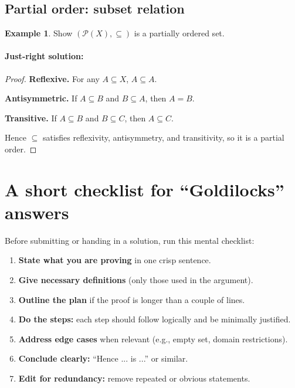 \documentclass[10pt]{article}
\theoremstyle{definition}
\newtheorem{example}{Example}[section]
\theoremstyle{plain}
\numberwithin{equation}{section}
\begin{document}
\subsection{Partial order: subset relation}
\begin{example}
Show \((\mathcal{P}(X),\subseteq)\) is a partially ordered set.
\end{example}

\paragraph{Just-right solution:}
\begin{proof}
\textbf{Reflexive.} For any \(A\subseteq X\), \(A\subseteq A\).

\textbf{Antisymmetric.} If \(A\subseteq B\) and \(B\subseteq A\), then \(A=B\).

\textbf{Transitive.} If \(A\subseteq B\) and \(B\subseteq C\), then \(A\subseteq C\).

Hence \(\subseteq\) satisfies reflexivity, antisymmetry, and transitivity, so it is a partial order.
\end{proof}

\section{A short checklist for ``Goldilocks'' answers}
Before submitting or handing in a solution, run this mental checklist:
\begin{enumerate}[label=\arabic*.]
  \item \textbf{State what you are proving} in one crisp sentence.
  \item \textbf{Give necessary definitions} (only those used in the argument).
  \item \textbf{Outline the plan} if the proof is longer than a couple of lines.
  \item \textbf{Do the steps:} each step should follow logically and be minimally justified.
  \item \textbf{Address edge cases} when relevant (e.g., empty set, domain restrictions).
  \item \textbf{Conclude clearly:} ``Hence ... is ...'' or similar.
  \item \textbf{Edit for redundancy:} remove repeated or obvious statements.
\end{enumerate}
\end{document}
